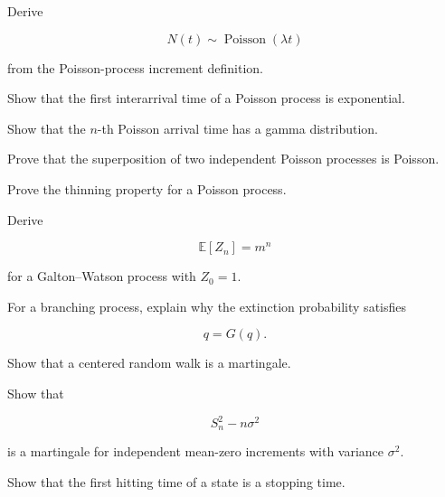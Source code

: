 \begin{exercise}[3]
Derive

\[
N(t)
\sim
\operatorname{Poisson}(\lambda t)
\]

from the Poisson-process increment definition.
\end{exercise}

\begin{exercise}[3]
Show that the first interarrival time of a Poisson process is
exponential.
\end{exercise}

\begin{exercise}[3]
Show that the \(n\)-th Poisson arrival time has a gamma distribution.
\end{exercise}

\begin{exercise}[3]
Prove that the superposition of two independent Poisson processes is
Poisson.
\end{exercise}

\begin{exercise}[3]
Prove the thinning property for a Poisson process.
\end{exercise}

\begin{exercise}[3]
Derive

\[
\mathbb{E}[Z_n]=m^n
\]

for a Galton--Watson process with \(Z_0=1\).
\end{exercise}

\begin{exercise}[3]
For a branching process, explain why the extinction probability
satisfies

\[
q=G(q).
\]
\end{exercise}

\begin{exercise}[3]
Show that a centered random walk is a martingale.
\end{exercise}

\begin{exercise}[3]
Show that

\[
S_n^2-n\sigma^2
\]

is a martingale for independent mean-zero increments with variance
\(\sigma^2\).
\end{exercise}

\begin{exercise}[3]
Show that the first hitting time of a state is a stopping time.
\end{exercise}

